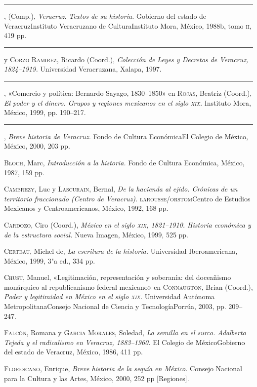 \documentclass[14pt,twoside,final]{extbook} %
\begin{document}
\rule{1cm}{0.4pt}, (Comp.), \emph{Veracruz. Textos de su historia.} Gobierno del estado de Vera\-cruz Instituto Veracruzano de Cultura Instituto Mora, México, 1988b, tomo \textsc{ii}, 419 pp.

\rule{1cm}{0.4pt} y \textsc{Corzo Ramírez}, Ricardo (Coord.), \emph{Colección de Leyes y Decretos de Veracruz, 1824--1919.} Universidad Veracruzana, Xalapa, 1997.

\rule{1cm}{0.4pt}, «Comercio y política: Bernardo Sayago, 1830--1850» en \textsc{Rojas}, Beatriz (Coord.), \emph{El poder y el dinero. Grupos y regiones mexicanos en el siglo \textsc{xix}.} Instituto Mora, México, 1999, pp. 190--217.

\rule{1cm}{0.4pt}, \emph{Breve historia de Veracruz.} Fondo de Cultura Económica El Colegio de México, México, 2000, 203 pp.

\textsc{Bloch}, Marc, \emph{Introducción a la historia.} Fondo de Cultura Económica, México, 1987, 159 pp.

\textsc{Cambrezy}, Luc y \textsc{Lascurain}, Bernal, \emph{De la hacienda al ejido. Crónicas de un territorio fraccionado (Centro de Veracruz).} \textsc{larousse/orstom} Centro de Estudios Mexicanos y Centroamericanos, México, 1992, 168 pp.

\textsc{Cardozo}, Ciro (Coord.), \emph{México en el siglo \textsc{xix}, 1821--1910. Historia económica y de la estructura social.} Nueva Imagen, México, 1999, 525 pp.

\textsc{Certeau}, Michel de, \emph{La escritura de la historia.} Universidad Iberoamericana, México, 1999, 3"a ed., 334 pp.

\textsc{Chust}, Manuel, «Legitimación, representación y soberanía: del doceañismo monárquico al republicanismo federal mexicano» en \textsc{Connaugton}, Brian (Coord.), \emph{Poder y legitimidad en México en el siglo \textsc{xix}.} Universidad Autónoma Metropolitana Consejo Nacional de Ciencia y Tecnología Porrúa, 2003, pp. 209--247.

\textsc{Falcón}, Romana y \textsc{García Morales}, Soledad, \emph{La semilla en el surco. Adalberto Tejeda y el radicalismo en Veracruz, 1883--1960.} El Colegio de México Gobierno del estado de Veracruz, México, 1986, 411 pp.

\textsc{Florescano}, Enrique, \emph{Breve historia de la sequía en México.} Consejo Nacional para la Cultura y las Artes, México, 2000, 252 pp [Regiones].
\end{document}
